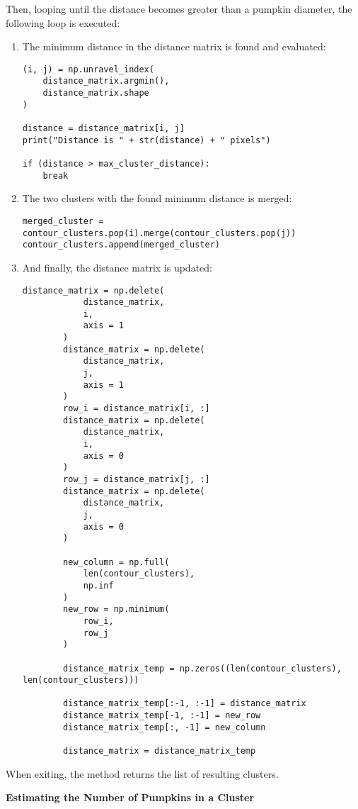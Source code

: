 \documentclass[../Head/Main.tex]{subfiles}
\begin{document}
Then, looping until the distance becomes greater than a pumpkin diameter, the following loop is executed:
\begin{enumerate}
\item The minimum distance in the distance matrix is found and evaluated:
\begin{verbatim}
(i, j) = np.unravel_index(
	distance_matrix.argmin(),
    distance_matrix.shape
)

distance = distance_matrix[i, j]
print("Distance is " + str(distance) + " pixels")

if (distance > max_cluster_distance):
	break
\end{verbatim}
\item The two clusters with the found minimum distance is merged:
\begin{verbatim}
merged_cluster = contour_clusters.pop(i).merge(contour_clusters.pop(j))
contour_clusters.append(merged_cluster)
\end{verbatim}
\item And finally, the distance matrix is updated:
\begin{verbatim}
distance_matrix = np.delete(
            distance_matrix,
            i,
            axis = 1
        )
        distance_matrix = np.delete(
            distance_matrix,
            j,
            axis = 1
        )
        row_i = distance_matrix[i, :]
        distance_matrix = np.delete(
            distance_matrix,
            i,
            axis = 0
        )
        row_j = distance_matrix[j, :]
        distance_matrix = np.delete(
            distance_matrix,
            j,
            axis = 0
        )

        new_column = np.full(
            len(contour_clusters),
            np.inf
        )
        new_row = np.minimum(
            row_i,
            row_j
        )

        distance_matrix_temp = np.zeros((len(contour_clusters), len(contour_clusters)))

        distance_matrix_temp[:-1, :-1] = distance_matrix
        distance_matrix_temp[-1, :-1] = new_row
        distance_matrix_temp[:, -1] = new_column

        distance_matrix = distance_matrix_temp
\end{verbatim}
\end{enumerate}
When exiting, the method returns the list of resulting clusters.\par
\textbf{Estimating the Number of Pumpkins in a Cluster}\\
\end{document}
